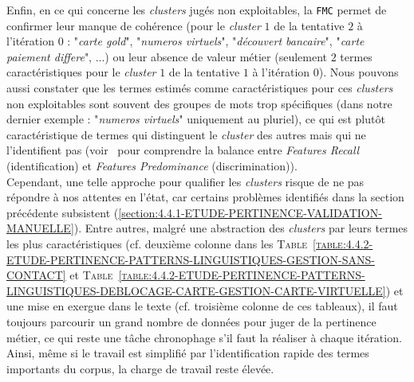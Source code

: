 			Enfin, en ce qui concerne les \textit{clusters} jugés non exploitables, la \texttt{FMC} permet de confirmer leur manque de cohérence (pour le \textit{cluster} $1$ de la tentative $2$ à l'itération $0$ : "\textit{carte gold}", "\textit{numeros virtuels}", "\textit{découvert bancaire}", "\textit{carte paiement differe}", ...) ou leur absence de valeur métier (seulement $2$ termes caractéristiques pour le \textit{cluster} $1$ de la tentative $1$ à l'itération $0$).
			Nous pouvons aussi constater que les termes estimés comme caractéristiques pour ces \textit{clusters} non exploitables sont souvent des groupes de mots trop spécifiques (dans notre dernier exemple : "\textit{numeros virtuels}" uniquement au pluriel), ce qui est plutôt caractéristique de termes qui distinguent le \textit{cluster} des autres mais qui ne l'identifient pas (voir~\cite{lamirel-etal:2017:novel-approach-feature} pour comprendre la balance entre \textit{Features Recall} (identification) et \textit{Features Predominance} (discrimination)).
			\\
			
			Cependant, une telle approche pour qualifier les \textit{clusters} risque de ne pas répondre à nos attentes en l'état, car certains problèmes identifiés dans la section précédente subsistent (\ref{section:4.4.1-ETUDE-PERTINENCE-VALIDATION-MANUELLE}).
			Entre autres, malgré une abstraction des \textit{clusters} par leurs termes les plus caractéristiques (cf. deuxième colonne dans les \textsc{Table~\ref{table:4.4.2-ETUDE-PERTINENCE-PATTERNS-LINGUISTIQUES-GESTION-SANS-CONTACT}} et \textsc{Table~\ref{table:4.4.2-ETUDE-PERTINENCE-PATTERNS-LINGUISTIQUES-DEBLOCAGE-CARTE-GESTION-CARTE-VIRTUELLE}}) et une mise en exergue dans le texte (cf. troisième colonne de ces tableaux), il faut toujours parcourir un grand nombre de données pour juger de la pertinence métier, ce qui reste une tâche chronophage s'il faut la réaliser à chaque itération.
			Ainsi, même si le travail est simplifié par l'identification rapide des termes importants du corpus, la charge de travail reste élevée.
			
